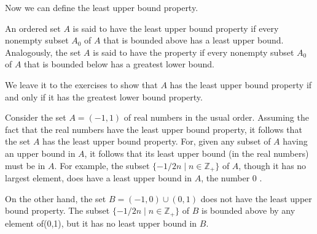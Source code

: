 Now we can define the least upper bound property.

\begin{definition}
 	An ordered set \(A\) is said to have the least upper bound property if every nonempty subset \(A_{0}\) of \(A\) that is bounded above has a least upper bound. Analogously, the set \(A\) is said to have the  property if every nonempty subset \(A_{0}\) of \(A\) that is bounded below has a greatest lower bound.
\end{definition}

We leave it to the exercises to show that \(A\) has the least upper bound 
property if and only if it has the greatest lower bound property.

\begin{centeredblock}
 \begin{example}
\label{ex:\thesection.\theexample}
 Consider the set \(A = ({-1,1})\) of real numbers in the usual order. Assuming the fact that the real numbers have the least upper bound property, it follows that the set \(A\) has the least upper bound property. For, given any subset of \(A\) having an upper bound in \(A\), it follows that its least upper bound (in the real numbers) must be in \(A\). For example, the subset \(\{ {-1/{2n} \mid n \in {\mathbb{Z}}_{+}}\}\) of \(A\), though it has no largest element, does have a least upper bound in \(A\), the number 0 .

 On the other hand, the set \(B = ({-1,0}) \cup ({0,1})\) does not have the least upper bound property. The subset \(\{ {-1/{2n} \mid n \in {\mathbb{Z}}_{+}}\}\) of \(B\) is bounded above by any element of(0,1), but it has no least upper bound in \(B\).
 \end{example}
\end{centeredblock}

